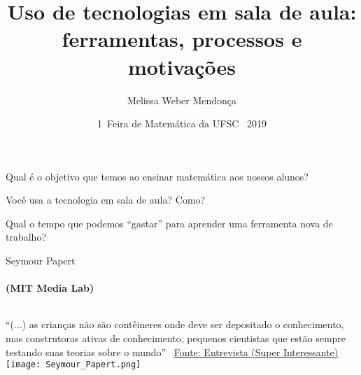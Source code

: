 \documentclass[10pt,]{beamer}
\title{Uso de tecnologias em sala de aula: ferramentas, processos e motivações}
\author{Melissa Weber Mendonça}
\institute{\small{Universidade Federal de Santa Catarina}}
\date{{1\textordfeminine\ Feira de Matemática da UFSC \textemdash\ 2019}}
\begin{document}

\begin{frame}[plain]
\maketitle  
\end{frame}



\begin{frame}
  \begin{center}
    Qual é o objetivo que temos ao ensinar matemática aos nossos alunos?
    \vfill
  \end{center}
\end{frame}

\begin{frame}{}
  \begin{center}
    Você usa a tecnologia em sala de aula? Como?
  \end{center}
\end{frame}

\begin{frame}{}
  \begin{center}
    Qual o tempo que podemos ``gastar'' para aprender uma ferramenta nova de trabalho?
  \end{center}
\end{frame}

\begin{frame}{Seymour Papert}
  \framesubtitle{(MIT Media Lab)}
  \begin{columns}
    \column{6cm}
    ``(...) as crianças não são contêineres onde deve ser depositado o conhecimento, mas construtoras ativas de conhecimento, pequenos cientistas que estão sempre testando suas teorias sobre o mundo''
    \vfill
    \textemdash\ \href{https://super.abril.com.br/tecnologia/a-maior-vantagem-competitiva-e-a-habilidade-de-aprender/}{Fonte: Entrevista (Super Interessante)}
    \column{5cm}
    \texttt{[image: Seymour\_Papert.png]}
  \end{columns}
\end{frame}
\end{document}
